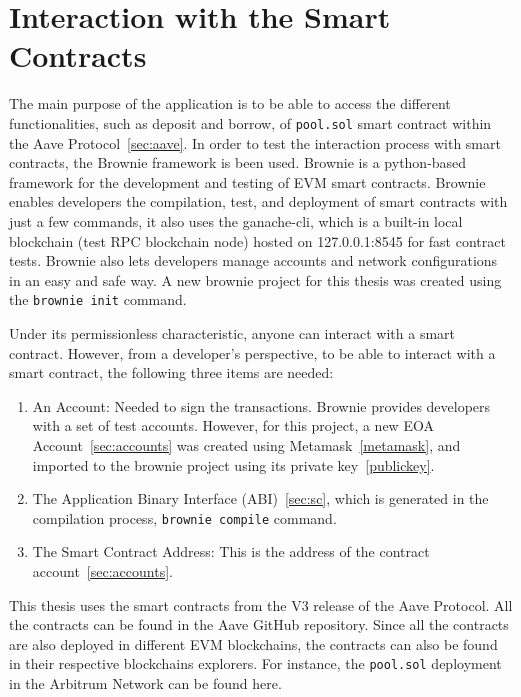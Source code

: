 \documentclass[11pt,a4paper]{report}
\begin{document}
\section{Interaction with the Smart Contracts}
The main purpose of the application is to be able to access the different functionalities, such as deposit and borrow, of \verb|pool.sol|  smart contract within the Aave Protocol~\ref{sec:aave}. In order to test the interaction process with smart contracts, the Brownie framework\cite{brow} is been used. Brownie is a python-based framework for the development and testing of EVM smart contracts. Brownie enables developers the compilation, test, and deployment of smart contracts with just a few commands, it also uses the ganache-cli\cite{ganache}, which is a built-in local blockchain (test RPC blockchain node) hosted on 127.0.0.1:8545 for fast contract tests. Brownie also lets developers manage accounts and network configurations in an easy and safe way. A new brownie project for this thesis was created using the \verb|brownie init| command.

Under its permissionless characteristic, anyone can interact with a smart contract. However, from a developer's perspective, to be able to interact with a smart contract, the following three items are needed:
\begin{enumerate}\label{sc_interaction}
	\item An Account: Needed to sign the transactions. Brownie provides developers with a set of test accounts. However, for this project, a new EOA Account~\ref{sec:accounts} was created using Metamask~\ref{metamask}, and imported to the brownie project using its private key~\ref{publickey}.
	\item The Application Binary Interface (ABI)~\ref{sec:sc}, which is generated in the compilation process, \verb|brownie compile| command.
	\item The Smart Contract Address: This is the address of the contract account~\ref{sec:accounts}. 
\end{enumerate}
This thesis uses the smart contracts from the V3 release of the Aave Protocol. All the contracts can be found in the Aave GitHub repository\cite{aavegithub}. Since all the contracts are also deployed in different EVM blockchains, the contracts can also be found in their respective blockchains explorers. For instance, the \verb|pool.sol| deployment in the Arbitrum Network can be found here\cite{arbiscan}.
\end{document}
